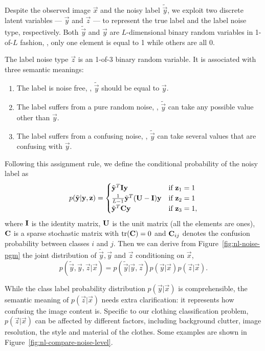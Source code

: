 Despite the observed image $\vec{x}$ and the noisy label $\tilde{\vec{y}}$, we exploit two discrete latent variables --- $\vec{y}$ and $\vec{z}$ --- to represent the true label and the label noise type, respectively. Both $\tilde{\vec{y}}$ and $\vec{y}$ are $L$-dimensional binary random variables in 1-of-$L$ fashion, \ie, only one element is equal to 1 while others are all 0.

The label noise type $\vec{z}$ is an 1-of-3 binary random variable. It is associated with three semantic meanings:
\begin{enumerate}
    \item The label is noise free, \ie, $\tilde{\vec{y}}$ should be equal to $\vec{y}$.
    \item The label suffers from a pure random noise, \ie, $\tilde{\vec{y}}$ can take any possible value other than $\vec{y}$.
    \item The label suffers from a confusing noise, \ie, $\tilde{\vec{y}}$ can take several values that are confusing with $\vec{y}$.
\end{enumerate}

Following this assignment rule, we define the conditional probability of the noisy label as
\begin{equation} \label{eq:nl-likelihood}
    p(\tilde{\mathbf{y}}|\mathbf{y},\mathbf{z}) = \begin{cases}
        \tilde{\mathbf{y}}^{T}\mathbf{I}\mathbf{y} & \text{if } \mathbf{z}_1 = 1 \\
        \frac{1}{L-1}\tilde{\mathbf{y}}^{T}(\mathbf{U} - \mathbf{I})\mathbf{y} & \text{if } \mathbf{z}_2 = 1 \\
        \tilde{\mathbf{y}}^{T}\mathbf{C}\mathbf{y} & \text{if } \mathbf{z}_3 = 1,
    \end{cases}
\end{equation}
where $\mathbf{I}$ is the identity matrix, $\mathbf{U}$ is the unit matrix (all the elements are ones), $\mathbf{C}$ is a sparse stochastic matrix with $\mathrm{tr}(\mathbf{C})=0$ and $\mathbf{C}_{ij}$ denotes the confusion probability between classes $i$ and $j$. Then we can derive from Figure~\ref{fig:nl-noise-pgm} the joint distribution of $\tilde{\vec{y}}, \vec{y}$ and $\vec{z}$ conditioning on $\vec{x}$,
\begin{equation} \label{eq:nl-joint-distribution}
  p(\tilde{\vec{y}}, \vec{y}, \vec{z} | \vec{x}) = p(\tilde{\vec{y}} | \vec{y}, \vec{z}) p(\vec{y} | \vec{x}) p(\vec{z} | \vec{x}).
\end{equation}

While the class label probability distribution $p(\vec{y} | \vec{x})$ is comprehensible, the semantic meaning of $p(\vec{z} | \vec{x})$ needs extra clarification: it represents how confusing the image content is. Specific to our clothing classification problem, $p(\vec{z} | \vec{x})$ can be affected by different factors, including background clutter, image resolution, the style and material of the clothes. Some examples are shown in Figure~\ref{fig:nl-compare-noise-level}.

